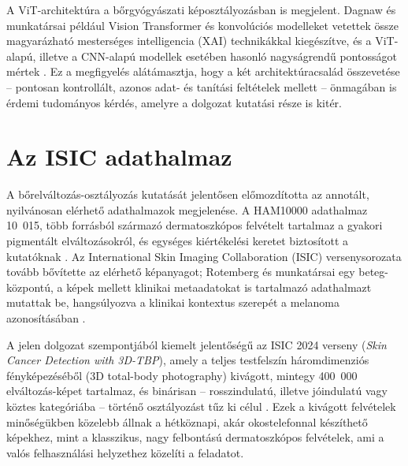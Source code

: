 A ViT-architektúra a bőrgyógyászati képosztályozásban is megjelent. Dagnaw és
munkatársai például Vision Transformer és konvolúciós modelleket vetettek össze
magyarázható mesterséges intelligencia (XAI) technikákkal kiegészítve, és a
ViT-alapú, illetve a CNN-alapú modellek esetében hasonló nagyságrendű pontosságot
mértek \cite{dagnaw2024vit}. Ez a megfigyelés alátámasztja, hogy a két
architektúracsalád összevetése -- pontosan kontrollált, azonos adat- és
tanítási feltételek mellett -- önmagában is érdemi tudományos kérdés, amelyre a
dolgozat kutatási része is kitér.

\section{Az ISIC adathalmaz}

A bőrelváltozás-osztályozás kutatását jelentősen előmozdította az annotált,
nyilvánosan elérhető adathalmazok megjelenése. A HAM10000 adathalmaz 10~015,
több forrásból származó dermatoszkópos felvételt tartalmaz a gyakori pigmentált
elváltozásokról, és egységes kiértékelési keretet biztosított a kutatóknak
\cite{tschandl2019ham10000}. Az International Skin Imaging Collaboration (ISIC)
versenysorozata tovább bővítette az elérhető képanyagot; Rotemberg és
munkatársai egy beteg-központú, a képek mellett klinikai metaadatokat is
tartalmazó adathalmazt mutattak be, hangsúlyozva a klinikai kontextus
szerepét a melanoma azonosításában \cite{rotemberg2021isic}.

A jelen dolgozat szempontjából kiemelt jelentőségű az ISIC 2024 verseny
(\textit{Skin Cancer Detection with 3D-TBP}), amely a teljes testfelszín
háromdimenziós fényképezéséből (3D total-body photography) kivágott, mintegy
400~000 elváltozás-képet tartalmaz, és binárisan -- rosszindulatú, illetve
jó\-indulatú vagy köztes kategóriába -- történő osztályozást tűz ki célul
\cite{isic2024}. Ezek a kivágott felvételek minőségükben közelebb állnak a
hétköznapi, akár okostelefonnal készíthető képekhez, mint a klasszikus,
nagy felbontású dermatoszkópos felvételek, ami a valós felhasználási
helyzethez közelíti a feladatot.

